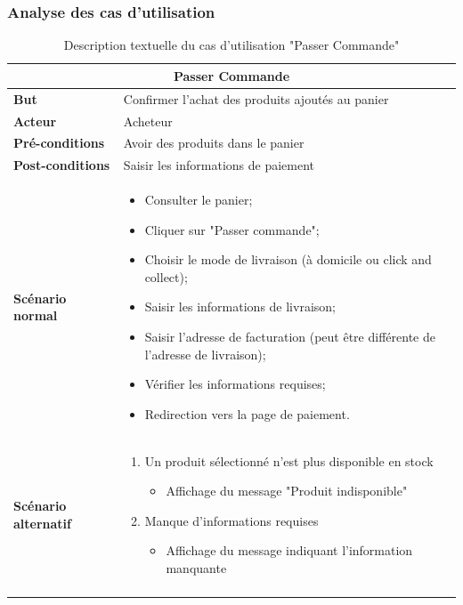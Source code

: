 \subsubsection{Analyse des cas d'utilisation}
\begin{longtable}{|p{4cm}|p{11cm}|}
\hline
\multicolumn{2}{|c|}{\textbf{Passer Commande}} \\ \hline
\textbf{But} & Confirmer l'achat des produits ajoutés au panier \\ \hline
\textbf{Acteur} & Acheteur \\ \hline
\textbf{Pré-conditions} & Avoir des produits dans le panier \\ \hline
\textbf{Post-conditions} & Saisir les informations de paiement \\ \hline
\textbf{Scénario normal} &
\begin{itemize}
    \item Consulter le panier;
    \item Cliquer sur "Passer commande";
    \item Choisir le mode de livraison (à domicile ou click and collect);
    \item Saisir les informations de livraison;
    \item Saisir l'adresse de facturation (peut être différente de l'adresse de livraison);
    \item Vérifier les informations requises;
    \item Redirection vers la page de paiement.
\end{itemize} \\ \hline
\textbf{Scénario alternatif} &
\begin{enumerate}
    \item Un produit sélectionné n'est plus disponible en stock
    \begin{itemize}
        \item Affichage du message "Produit indisponible"
    \end{itemize}
    \item Manque d'informations requises
    \begin{itemize}
        \item Affichage du message indiquant l'information manquante
    \end{itemize}
\end{enumerate} \\ \hline
\caption{Description textuelle du cas d'utilisation "Passer Commande"}
\label{tab:passer_commande}
\end{longtable}

